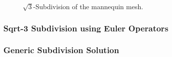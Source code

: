 \begin{figure}
    \caption{$\sqrt{3}$-Subdivision of the mannequin mesh.}
    \label{fig:sqrt3}\vspace*{-2mm}
\end{figure}



\newcommand{\mySqrt}{$\sqrt{3}$}
\subsubsection*{Sqrt-3 Subdivision using Euler Operators}


\subsubsection*{Generic Subdivision Solution}



%

